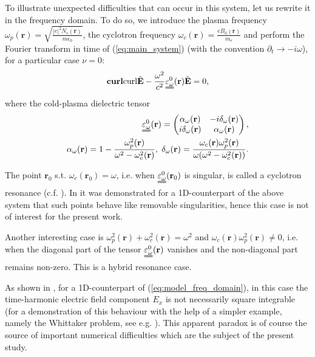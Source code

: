 {To illustrate unexpected difficulties that can occur in this system, let us rewrite it in the frequency domain. To do so, 
we introduce the plasma frequency $\omega_p(\mathbf{r})=\sqrt{\frac{|e|^2N_e(\mathbf{r})}{m\epsilon_0}}$, 
the cyclotron frequency $\omega_c(\mathbf{r})=\frac{e B_0(\mathbf{r})}{m_e}$ and perform the Fourier transform 
in time of (\ref{eq:main_system}) (with the convention $\partial_t\rightarrow -i\omega$), for a 
particular case $\nu=0$:
\begin{align}
\label{eq:model_freq_domain}
 \mathbf{curl}{\operatorname{curl}}\hat{\mathbf{E}}-\frac{\omega^2}{c^2}\uuline{\varepsilon_{\omega}^{0}}(\mathbf{r})\hat{\mathbf{E}}=0,
\end{align}
where the cold-plasma dielectric tensor \cite[Chapter 1-2]{Stix}
\begin{align}
\nonumber
\uuline{\varepsilon_{\omega}^{0}}(\mathbf{r})=\left(
 \begin{matrix}
  \alpha_{\omega}(\mathbf{r})& -i\delta_{\omega}(\mathbf{r})\\
  i\delta_{\omega}(\mathbf{r}) & \alpha_{\omega}(\mathbf{r})
 \end{matrix}
\right),\\
\label{eq:alpha_delta}
\alpha_{\omega}(\mathbf{r})=1-\frac{\omega_p^2(\mathbf{r})}{\omega^2-\omega_c^2(\mathbf{r})},\; \delta_{\omega}(\mathbf{r})=\frac{\omega_c(\mathbf{r})\omega_p^2(\mathbf{r})}{\omega(\omega^2-\omega_c^2(\mathbf{r}))}.
\end{align}

The point $\mathbf{r}_0$ s.t. $\omega_c(\mathbf{r}_0)=\omega$, i.e. when $\uuline{\varepsilon_{\omega}^{0}}(\mathbf{r}_0)$ is singular, is called a cyclotron resonance (c.f. \cite[Chapter 1-5]{Stix}). 
In \cite{singular_solutions} it was demonstrated for a 1D-counterpart of the above system that such points behave like removable singularities, 
hence this case is not of interest for the present work. 

Another interesting case is $\omega_p^2(\mathbf{r})+\omega_c^2(\mathbf{r})=\omega^2$ and $\omega_c(\mathbf{r})\omega_p^2(\mathbf{r})\neq 0$, i.e. when the diagonal part of the tensor 
$\uuline{\varepsilon_{\omega}^{0}}(\mathbf{r})$ vanishes and the non-diagonal part remains non-zero. This is a hybrid resonance case. 

As shown in \cite{Despres_2014, singular_solutions}, for a 1D-counterpart of (\ref{eq:model_freq_domain}), in this case the time-harmonic electric field component $E_x$ is not necessarily square 
integrable (for a demonstration of this behaviour with the help of a simpler example, namely the Whittaker problem, see e.g. \cite{Despres_2014}). 
This apparent paradox is of course the source of important numerical difficulties which are the subject of the present study. 


}
